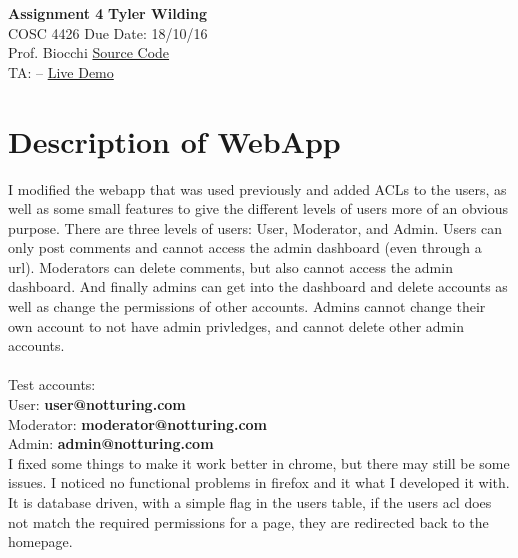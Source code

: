 \documentclass[a4paper, 11pt]{article}
\begin{document}
\noindent
\large\textbf{Assignment 4} \hfill \textbf{Tyler Wilding} \\
\normalsize COSC 4426 \hfill Due Date: 18/10/16 \\
Prof. Biocchi \hfill \href{https://github.com/xTVaser/Schoolwork-Fall-2016/tree/master/Internet%20Security/acl}{Source Code} \\
TA: -- \hfill \href{https://notturing.ddns.net/tyler/IS_ASS4/form.php}{Live Demo}

\section*{Description of WebApp}
I modified the webapp that was used previously and added ACLs to the users, as well as some small features to give the different levels of users more of an obvious purpose.  There are three levels of users: User, Moderator, and Admin.  Users can only post comments and cannot access the admin dashboard (even through a url).  Moderators can delete comments, but also cannot access the admin dashboard.  And finally admins can get into the dashboard and delete accounts as well as change the permissions of other accounts.  Admins cannot change their own account to not have admin privledges, and cannot delete other admin accounts.\\\\
Test accounts:\\
User: \textbf{user@notturing.com}\\
Moderator: \textbf{moderator@notturing.com}\\
Admin: \textbf{admin@notturing.com}\\

I fixed some things to make it work better in chrome, but there may still be some issues.  I noticed no functional problems in firefox and it what I developed it with.  It is database driven, with a simple flag in the users table, if the users acl does not match the required permissions for a page, they are redirected back to the homepage.
\end{document}
